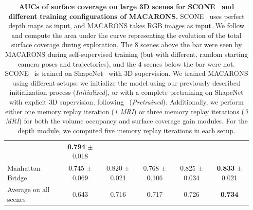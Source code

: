 \begin{table}
{{\begin{tabular}{@{}lccccc@{}}
& \textbf{0.794} $\pm$ 0.018 \\ 
%
Manhattan Bridge 
& 0.745 $\pm$ 0.069
& 0.820 $\pm$ 0.021
& 0.768 $\pm$ 0.106
& 0.825 $\pm$ 0.034
& \textbf{0.833} $\pm$ 0.021 \\ 
%
\midrule 
Average on all scenes 
& 0.643 
& 0.716 
& 0.717 
& 0.726 
& \textbf{0.734} \\ 
    \bottomrule
  \end{tabular}
  }}
  \caption{{\bf AUCs of surface coverage on large 3D scenes for SCONE~\cite{guedon-nips22-scone-surface-coverage} and different training configurations of MACARONS.} SCONE~\cite{guedon-nips22-scone-surface-coverage} uses perfect depth maps as input, and MACARONS takes RGB images as input. We follow \cite{guedon-nips22-scone-surface-coverage} and compute the area under the curve representing the evolution of the total surface coverage during exploration. The 8 scenes above the bar were seen by MACARONS during self-supervised training (but with different, random starting camera poses and trajectories), and the 4 scenes below the bar were not. SCONE~\cite{guedon-nips22-scone-surface-coverage} is trained on ShapeNet~\cite{chang-15-shapenet} with 3D supervision. We trained MACARONS using different setups: we initialize the model using our previously described initialization process (\emph{Initialized}), or with a complete pretraining on ShapeNet with explicit 3D supervision, following~\cite{guedon-nips22-scone-surface-coverage} (\emph{Pretrained}). Additionally, we perform either one memory replay iteration (\emph{1 MRI}) or three memory replay iterations (\emph{3 MRI}) for both the volume occupancy and surface coverage gain modules. For the depth module, we computed five memory replay iterations in each setup.}
  \label{tab:ablation_coverage_auc}
\end{table}
